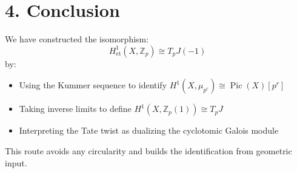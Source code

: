 \documentclass[12pt]{article}
\begin{document}
\section*{4. Conclusion}
We have constructed the isomorphism:
\[
H^1_{\text{et}}(X, \mathbb{Z}_p) \cong T_p J(-1)
\]
by:
\begin{itemize}
  \item Using the Kummer sequence to identify \( H^1(X, \mu_{p^r}) \cong \operatorname{Pic}(X)[p^r] \)
  \item Taking inverse limits to define \( H^1(X, \mathbb{Z}_p(1)) \cong T_p J \)
  \item Interpreting the Tate twist as dualizing the cyclotomic Galois module
\end{itemize}
This route avoids any circularity and builds the identification from geometric input.
\end{document}
